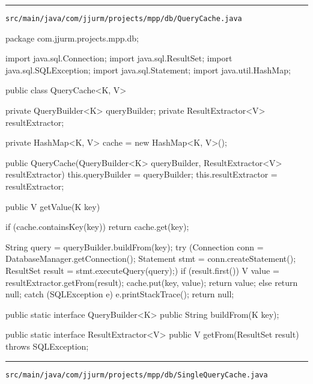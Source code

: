 \noindent\rule{\textwidth}{0.4pt}

\nointerlineskip
\texttt{src/main/java/com/jjurm/projects/mpp/db/QueryCache.java}

\begin{javacode}
package com.jjurm.projects.mpp.db;

import java.sql.Connection;
import java.sql.ResultSet;
import java.sql.SQLException;
import java.sql.Statement;
import java.util.HashMap;

public class QueryCache<K, V> {

  private QueryBuilder<K> queryBuilder;
  private ResultExtractor<V> resultExtractor;

  private HashMap<K, V> cache = new HashMap<K, V>();

  public QueryCache(QueryBuilder<K> queryBuilder, ResultExtractor<V> resultExtractor) {
    this.queryBuilder = queryBuilder;
    this.resultExtractor = resultExtractor;
  }

  public V getValue(K key) {

    if (cache.containsKey(key)) {
      return cache.get(key);
    }

    String query = queryBuilder.buildFrom(key);
    try (Connection conn = DatabaseManager.getConnection();
        Statement stmt = conn.createStatement();
        ResultSet result = stmt.executeQuery(query);) {
      if (result.first()) {
        V value = resultExtractor.getFrom(result);
        cache.put(key, value);
        return value;
      } else {
        return null;
      }
    } catch (SQLException e) {
      e.printStackTrace();
      return null;
    }
  }

  public static interface QueryBuilder<K> {
    public String buildFrom(K key);
  }

  public static interface ResultExtractor<V> {
    public V getFrom(ResultSet result) throws SQLException;
  }

}
\end{javacode}

\noindent\rule{\textwidth}{0.4pt}

\nointerlineskip
\texttt{src/main/java/com/jjurm/projects/mpp/db/SingleQueryCache.java}

